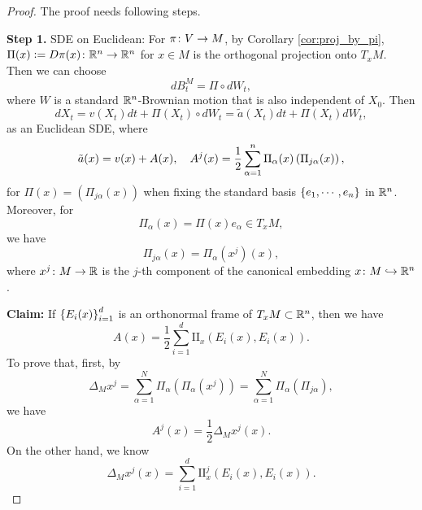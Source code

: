 \begin{proof}
    The proof needs following steps.

    \vspace{0.5em}
    \textbf{Step 1.} SDE on Euclidean: For $\pi \colon V \rightarrow M$, by Corollary \ref{cor:proj_by_pi}, $\Pi(x) \vcentcolon= D\pi(x) \colon \mathbb{R}^n \rightarrow \mathbb{R}^n$ for $x \in M$ is the orthogonal projection onto $T_xM$. Then we can choose
    \begin{equation*}
        dB^M_t = \Pi \circ dW_t,
    \end{equation*}
    where $W$ is a standard $\mathbb{R}^n$-Brownian motion that is also independent of $X_0$. Then
    \begin{equation}\label{eq:eucl_ext_diff}
        dX_t = v(X_t)dt + \Pi(X_t) \circ dW_t = \tilde{a}(X_t) dt + \Pi(X_t)dW_t,
    \end{equation}
    as an Euclidean SDE, where
    \begin{equation*}
        \tilde{a}(x) = v(x) + A(x),\quad A^j(x) = \frac{1}{2} \sum_{\alpha = 1}^n \Pi_{\alpha}(x)\left(\Pi_{j\alpha}(x)\right),
    \end{equation*}
    for $\Pi(x) = (\Pi_{j\alpha}(x))$ when fixing the standard basis $\left\{e_1,\cdots, e_n\right\}$ in $\mathbb{R}^n$. Moreover, for
    \begin{equation*}
        \Pi_\alpha(x) = \Pi(x)e_\alpha \in T_x M,
    \end{equation*}
    we have
    \begin{equation*}
        \Pi_{j\alpha}(x) = \Pi_\alpha (x^j)(x),
    \end{equation*}
    where $x^j \colon M \rightarrow \mathbb{R}$ is the $j$-th component of the canonical embedding $x \colon M \hookrightarrow \mathbb{R}^n$.
    
    \vspace{0.25em}
    \textbf{Claim:} If $\left\{E_i(x)\right\}_{i=1}^d$ is an orthonormal frame of $T_xM \subset \mathbb{R}^n$, then we have
    \begin{equation*}
        A(x) = \frac{1}{2} \sum_{i=1}^d \mathrm{II}_x(E_i(x),E_i(x)).
    \end{equation*}
    To prove that, first, by
    \begin{equation*}
        \Delta_Mx^j = \sum_{\alpha = 1}^N\Pi_\alpha (\Pi_\alpha(x^j)) = \sum_{\alpha = 1}^N\Pi_\alpha (\Pi_{j\alpha}),
    \end{equation*}
    we have
    \begin{equation*}
        A^j(x) = \frac{1}{2}\Delta_Mx^j(x).
    \end{equation*}
    On the other hand, we know
    \begin{equation*}
        \Delta_Mx^j(x) = \sum_{i=1}^d\mathrm{II}^j_x(E_i(x),E_i(x)).
    \end{equation*}


\end{proof}
